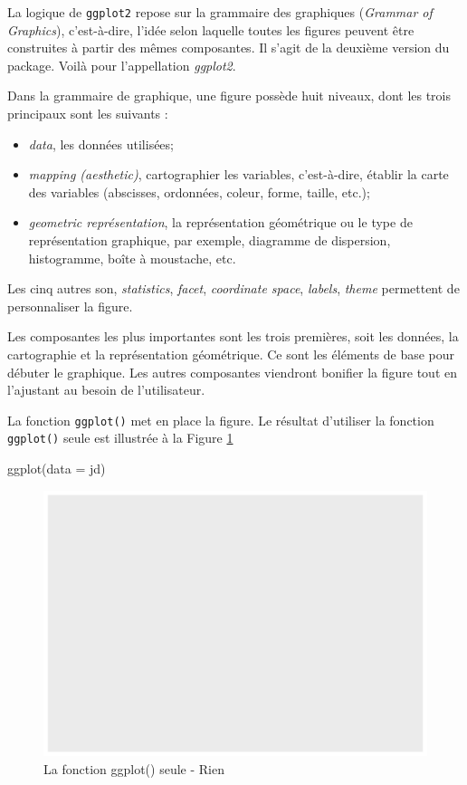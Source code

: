 \documentclass[
]{book}
\newenvironment{Shaded}{}{}
\newcommand{\AttributeTok}[1]{#1}
\newcommand{\FunctionTok}[1]{#1}
\newcommand{\NormalTok}[1]{#1}
\begin{document}
La logique de \texttt{ggplot2} repose sur la grammaire des graphiques (\emph{Grammar of Graphics}), c'est-à-dire, l'idée selon laquelle toutes les figures peuvent être construites à partir des mêmes composantes. Il s'agit de la deuxième version du package. Voilà pour l'appellation \emph{ggplot2}.

Dans la grammaire de graphique, une figure possède huit niveaux, dont les trois principaux sont les suivants :

\begin{itemize}
\item
  \emph{data}, les données utilisées;
\item
  \emph{mapping (aesthetic)}, cartographier les variables, c'est-à-dire, établir la carte des variables (abscisses, ordonnées, coleur, forme, taille, etc.);
\item
  \emph{geometric représentation}, la représentation géométrique ou le type de représentation graphique, par exemple, diagramme de dispersion, histogramme, boîte à moustache, etc.
\end{itemize}

Les cinq autres son, \emph{statistics}, \emph{facet}, \emph{coordinate space}, \emph{labels}, \emph{theme} permettent de personnaliser la figure.

Les composantes les plus importantes sont les trois premières, soit les données, la cartographie et la représentation géométrique. Ce sont les éléments de base pour débuter le graphique. Les autres composantes viendront bonifier la figure tout en l'ajustant au besoin de l'utilisateur.

La fonction \texttt{ggplot()} met en place la figure. Le résultat d'utiliser la fonction \texttt{ggplot()} seule est illustrée à la Figure \ref{fig:ggplotseul}

\begin{Shaded}
\begin{Highlighting}[]
\FunctionTok{ggplot}\NormalTok{(}\AttributeTok{data =}\NormalTok{ jd)}
\end{Highlighting}
\end{Shaded}

\begin{figure}

{\centering \includegraphics[width=0.75\linewidth,height=0.75\textheight]{07-Visualiser_files/figure-latex/ggplotseul-1} 

}

\caption{La fonction ggplot() seule - Rien}\label{fig:ggplotseul}
\end{figure}
\end{document}
